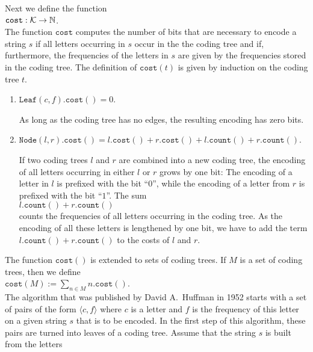 Next we define the function
\\[0.2cm]
\hspace*{1.3cm}
$\texttt{cost}: \mathcal{K} \rightarrow {\mathbb N}$.
\\[0.2cm]
The function $\texttt{cost}$ computes the number of bits that are necessary to encode a string $s$ if 
all letters occurring in $s$ occur in the the coding tree and if, furthermore, the frequencies of the letters
in $s$ are given by the frequencies stored in the coding tree.
The definition of $\texttt{cost}(t)$ is given by induction on the coding tree $t$.
\begin{enumerate}
\item $\texttt{Leaf}(c,f).\texttt{cost}() = 0$.

      As long as the coding tree has no edges, the resulting encoding has zero bits.
\item $\texttt{Node}(l,r).\texttt{cost}() = 
       l.\texttt{cost}() + r.\texttt{cost}() + l.\texttt{count}() + r.\texttt{count}()$.

      If two coding trees $l$ and $r$ are combined into a new coding tree, the encoding of all letters
      occurring in either $l$ or $r$ grows by one bit:  The encoding of a letter in $l$ is prefixed with the
      bit ``$0$'', while the encoding of a letter from $r$ is prefixed with the bit ``$1$''.  The sum
      \\[0.2cm]
      \hspace*{1.3cm}
      $l.\texttt{count}() + r.\texttt{count}()$
      \\[0.2cm] 
      counts the frequencies of all letters occurring in the coding tree.
      As the encoding of all these letters is lengthened by one bit,
      we have to add the term $l.\texttt{count}() + r.\texttt{count}()$ to the costs of $l$ and $r$.
\end{enumerate}
The function  $\texttt{cost}()$ is extended to sets of coding trees.  If $M$ is a set of coding trees, then we
define
\\[0.2cm]
\hspace*{1.3cm}
$\texttt{cost}(M) := \sum\limits_{n\in M} n.\texttt{cost}()$. 
\\[0.2cm]
The algorithm that was published by David A.~Huffman in 1952 \cite{huffman:52} starts with a set of pairs of
the form $\langle c, f\rangle$ where $c$ is a letter and $f$ is the frequency of this letter on a given string
$s$ that is to be encoded.  In the first step of this algorithm, these pairs are turned into leaves of a coding tree.
Assume that the string $s$ is built from the  letters
